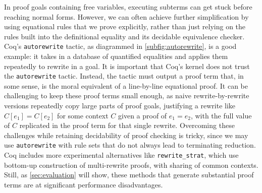 In proof goals containing free variables, executing subterms can get stuck before reaching normal forms.
However, we can often achieve further simplification by using equational rules that we prove explicitly, rather than just relying on the rules built into the definitional equality and its decidable equivalence checker.
Coq's \texttt{autorewrite} tactic, as diagrammed in \autoref{subfig:autorewrite}, is a good example: it takes in a database of quantified equalities and applies them repeatedly to rewrite in a goal.
It is important that Coq's kernel does not trust the \texttt{autorewrite} tactic.
Instead, the tactic must output a proof term that, in some sense, is the moral equivalent of a line-by-line equational proof.
It can be challenging to keep these proof terms small enough, as naive rewrite-by-rewrite versions repeatedly copy large parts of proof goals, justifying a rewrite like $C[e_1] = C[e_2]$ for some context $C$ given a proof of $e_1 = e_2$, with the full value of $C$ replicated in the proof term for that single rewrite.
Overcoming these challenges while retaining decidability of proof checking is tricky, since we may use \texttt{autorewrite} with rule sets that do not always lead to terminating reduction.
Coq includes more experimental alternatives like \texttt{rewrite\_strat}, which use bottom-up construction of multi-rewrite proofs, with sharing of common contexts.
Still, as \autoref{sec:evaluation} will show, these methods that generate substantial proof terms are at significant performance disadvantages.


